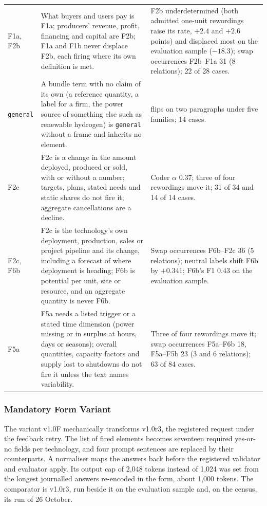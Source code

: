 \begin{longtable}{@{}>{\raggedright\arraybackslash}p{14mm}>{\raggedright\arraybackslash}p{84mm}>{\raggedright\arraybackslash}p{50mm}@{}}
F1a, F2b & What buyers and users pay is F1a; producers' revenue, profit, financing and capital are F2b; F1a and F1b never displace F2b, each firing where its own definition is met. & F2b underdetermined (both admitted one-unit rewordings raise its rate, $+2.4$ and $+2.6$ points) and displaced most on the evaluation sample ($-18.3$); swap occurrences F2b--F1a 31 (8 relations); 22 of 28 cases. \\
\texttt{general} & A bundle term with no claim of its own (a reference quantity, a label for a firm, the power source of something else such as renewable hydrogen) is \texttt{general} without a frame and inherits no element. & 10 flips on two paragraphs under five families; 14 cases. \\
F2c & F2c is a change in the amount deployed, produced or sold, with or without a number; targets, plans, stated needs and static shares do not fire it; aggregate cancellations are a decline. & Coder $\alpha$ 0.37; three of four rewordings move it; 31 of 34 and 14 of 14 cases. \\
F2c, F6b & F2c is the technology's own deployment, production, sales or project pipeline and its change, including a forecast of where deployment is heading; F6b is potential per unit, site or resource, and an aggregate quantity is never F6b. & Swap occurrences F6b--F2c 36 (5 relations); neutral labels shift F6b by $+0.341$; F6b's F1 0.43 on the evaluation sample. \\
F5a & F5a needs a listed trigger or a stated time dimension (power missing or in surplus at hours, days or seasons); overall quantities, capacity factors and supply lost to shutdowns do not fire it unless the text names variability. & Three of four rewordings move it; swap occurrences F5a--F6b 18, F5a--F5b 23 (3 and 6 relations); 63 of 84 cases. \\
\end{longtable}
\endgroup

\subsubsection{Mandatory Form Variant}\label{app:form_variant}

The variant v1.0F mechanically transforms v1.0r3, the registered request under the feedback retry. The list of fired elements becomes seventeen required yes-or-no fields per technology, and four prompt sentences are replaced by their counterparts. A normaliser maps the answers back before the registered validator and evaluator apply. Its output cap of 2,048 tokens instead of 1,024 was set from the longest journalled answers re-encoded in the form, about 1,000 tokens. The comparator is v1.0r3, run beside it on the evaluation sample and, on the census, its run of 26 October.

